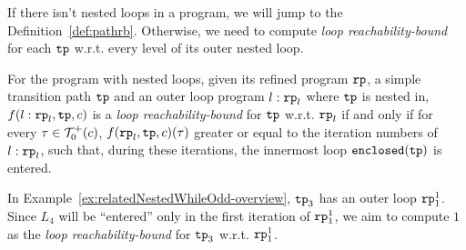 If there isn't nested loops in a program, we will jump to the Definition~\ref{def:pathrb}.
Otherwise, we need to compute \emph{loop reachability-bound}
for each $\mathtt{tp}$ w.r.t. every level of its outer nested loop.
\begin{defn}
For the program with nested loops, given its refined program $\mathtt{rp}$, a simple transition path $\mathtt{tp}$ and an outer loop
program $l: \mathtt{rp}_l$ where $\mathtt{tp}$ is nested in,
$f(l: \mathtt{rp}_l, \mathtt{tp}, c)$ is a \emph{loop reachability-bound} for $\mathtt{tp}$ w.r.t. $\mathtt{rp}_l$ if and only if
for every $\mathtt{\tau} \in \mathcal{T}^{+}_0(c)$, $f(\mathtt{rp}_l, \mathtt{tp}, c)(\mathtt{\tau})$  greater or equal to the
iteration numbers of $l: \mathtt{rp}_l$,
such that,
during these iterations, the innermost loop $\mathtt{enclosed(\mathtt{tp})}$ is entered.
\end{defn}
In Example~\ref{ex:relatedNestedWhileOdd-overview}, $\mathtt{tp}_3$ has an outer loop $\mathtt{rp}_1^1$. Since $L_4$ will be ``entered'' only in the first iteration of $\mathtt{rp}_1^1$,
we aim to compute $1$ as the \emph{loop reachability-bound} for $\mathtt{tp}_3$ w.r.t. $\mathtt{rp}_1^1$.

